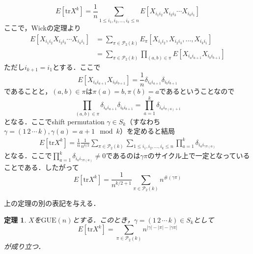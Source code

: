 \documentclass{ltjsarticle}
\makeatletter
\theoremstyle{mystyle1}
\newtheorem{thm}[dfn]{定理}
\theoremstyle{mystyle2}
\theoremstyle{mystyle3}
\renewenvironment{proof}[1][\proofname]{\par
  \pushQED{\qed}%
  \normalfont
  \topsep6\p@\@plus6\p@ \trivlist
  \item[\hskip\labelsep{\bfseries\sffamily #1}]\ignorespaces
}{%
  \popQED\endtrivlist\@endpefalse
}
\renewcommand\proofname{証明}
\makeatother
\begin{document}
\begin{proof}
    \begin{equation}
        E[\mathrm{tr}X^k]=\frac{1}{n}\sum_{1\leq i_1,i_2,\ldots,i_k\leq n}E[X_{i_1i_2}X_{i_2i_3}\cdots X_{i_ki_1}]
    \end{equation}
    ここで，Wickの定理より
    \begin{equation}
        \begin{split}
            E[X_{i_1i_2}X_{i_2i_3}\cdots X_{i_ki_1}]
            &=\sum_{\pi\in\mathcal{P}_2(k)}E_\pi[X_{i_1i_2},X_{i_2i_3},\ldots, X_{i_ki_1}] \\
            &=\sum_{\pi\in\mathcal{P}_2(k)}\prod_{(a,b)\in\pi}E[X_{i_ai_{a+1}}X_{i_bi_{b+1}}]
        \end{split}
    \end{equation}
    ただし$i_{k+1}=i_1$とする．ここで
    \begin{equation}
        E[X_{i_ai_{a+1}}X_{i_bi_{b+1}}]=\frac{1}{n}\delta_{i_ai_{a+1}}\delta_{i_bi_{b+1}}
    \end{equation}
    であることと，$(a,b)\in\pi$は$\pi(a)=b,\pi(b)=a$であるということなので
    \begin{equation}
        \prod_{(a,b)\in\pi}\delta_{i_ai_{a+1}}\delta_{i_bi_{b+1}}=\prod_{a=1}^k\delta_{i_ai_{\pi(a)+1}}
    \end{equation}
    となる．ここでshift permutation $\gamma\in S_k$（すなわち$\gamma=(1\,2\,\cdots\,k),\gamma(a)=a+1\mod k$）を定めると結局
    \begin{equation}
        \begin{split}
            E[\mathrm{tr}X^k]=\frac{1}{n}\frac{1}{n^{k/2}}\sum_{\pi\in\mathcal{P}_2(k)}\sum_{1\leq i_1,i_2,\ldots,i_k\leq n}\prod_{a=1}^k\delta_{i_ai_{\gamma\pi(a)}}
        \end{split}
    \end{equation}
    となる．ここで$\prod_{a=1}^k\delta_{i_ai_{\gamma\pi(a)}}\neq 0$であるのは$\gamma\pi$のサイクル上で一定となっていることである．したがって%
    \begin{equation}
        E[\mathrm{tr}X^k]=\frac{1}{n^{k/2+1}}\sum_{\pi\in\mathcal{P}_2(k)}n^{\#(\gamma\pi)}
    \end{equation}
\end{proof}

上の定理の別の表記を与える．

\begin{thm}
    $X$を$\mathrm{GUE}(n)$とする．このとき，$\gamma=(1\,2\,\cdots\,k)\in S_k$として
    \begin{equation}
        E[\mathrm{tr}X^k]=\sum_{\pi\in\mathcal{P}_2(k)}n^{|\gamma|-|\pi|-|\gamma\pi|}
    \end{equation}
    が成り立つ．
\end{thm}
\end{document}
